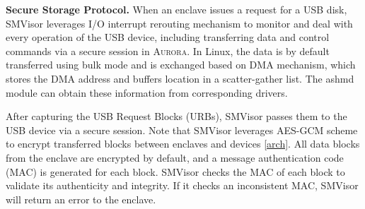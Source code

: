 
\textbf{Secure Storage Protocol.}
When an enclave issues a request for a USB disk, SMVisor leverages I/O interrupt rerouting mechanism to monitor and deal with every operation of the USB device, including transferring data and control commands via a secure session in \textsc{Aurora}. In Linux, the data is by default transferred using bulk mode and is exchanged based on DMA mechanism, which stores the DMA address and buffers location in a {scatter-gather} list. The ashmd module can obtain these information from corresponding drivers.

After capturing the USB Request Blocks (URBs), SMVisor passes them to the USB device via a secure session.  Note that SMVisor leverages AES-GCM scheme to encrypt transferred blocks between enclaves and devices \ref{arch}. All data blocks from the enclave are encrypted by default, and a message authentication code (MAC) is generated for each block. SMVisor checks the MAC of each block to validate its authenticity and integrity. If it checks an inconsistent MAC, SMVisor will return an error to the enclave.

